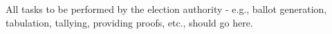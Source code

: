 All tasks to be performed by the election authority -\/ e.\+g., ballot generation, tabulation, tallying, providing proofs, etc., should go here. 